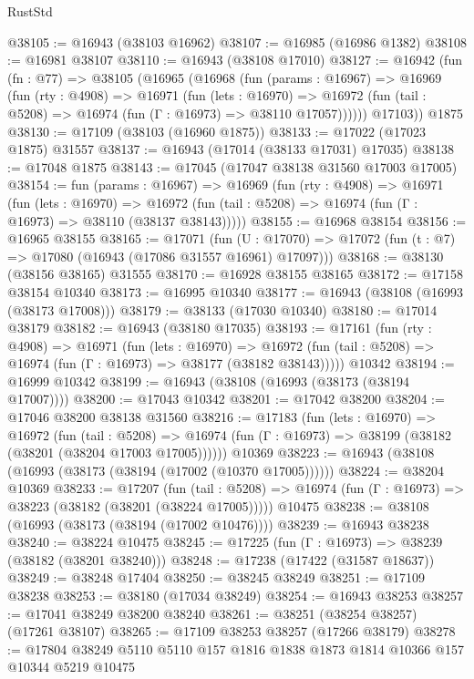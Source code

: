 \begin{lexlean}{RustStd}
\begin{coremodule}
@38105 := @16943 (@38103 @16962)
@38107 := @16985 (@16986 @1382)
@38108 := @16981 @38107
@38110 := @16943 (@38108 @17010)
@38127 := @16942
    (fun (fn : @77) =>
    @38105
      (@16965
        (@16968
          (fun (params : @16967) =>
          @16969
            (fun (rty : @4908) =>
            @16971
              (fun (lets : @16970) =>
              @16972 (fun (tail : @5208) => @16974 (fun (Γ : @16973) => @38110 @17057))))))
        @17103))
    @1875
@38130 := @17109 (@38103 (@16960 @1875))
@38133 := @17022 (@17023 @1875) @31557
@38137 := @16943 (@17014 (@38133 @17031) @17035)
@38138 := @17048 @1875
@38143 := @17045 (@17047 @38138 @31560 @17003 @17005)
@38154 := fun (params : @16967) =>
  @16969
    (fun (rty : @4908) =>
    @16971
      (fun (lets : @16970) =>
      @16972 (fun (tail : @5208) => @16974 (fun (Γ : @16973) => @38110 (@38137 @38143)))))
@38155 := @16968 @38154
@38156 := @16965 @38155
@38165 := @17071
    (fun (U : @17070) => @17072 (fun (t : @7) => @17080 (@16943 (@17086 @31557 @16961) @17097)))
@38168 := @38130 (@38156 @38165) @31555
@38170 := @16928 @38155 @38165
@38172 := @17158 @38154 @10340
@38173 := @16995 @10340
@38177 := @16943 (@38108 (@16993 (@38173 @17008)))
@38179 := @38133 (@17030 @10340)
@38180 := @17014 @38179
@38182 := @16943 (@38180 @17035)
@38193 := @17161
    (fun (rty : @4908) =>
    @16971
      (fun (lets : @16970) =>
      @16972 (fun (tail : @5208) => @16974 (fun (Γ : @16973) => @38177 (@38182 @38143)))))
    @10342
@38194 := @16999 @10342
@38199 := @16943 (@38108 (@16993 (@38173 (@38194 @17007))))
@38200 := @17043 @10342
@38201 := @17042 @38200
@38204 := @17046 @38200 @38138 @31560
@38216 := @17183
    (fun (lets : @16970) =>
    @16972
      (fun (tail : @5208) =>
      @16974 (fun (Γ : @16973) => @38199 (@38182 (@38201 (@38204 @17003 @17005))))))
    @10369
@38223 := @16943 (@38108 (@16993 (@38173 (@38194 (@17002 (@10370 @17005))))))
@38224 := @38204 @10369
@38233 := @17207
    (fun (tail : @5208) => @16974 (fun (Γ : @16973) => @38223 (@38182 (@38201 (@38224 @17005)))))
    @10475
@38238 := @38108 (@16993 (@38173 (@38194 (@17002 @10476))))
@38239 := @16943 @38238
@38240 := @38224 @10475
@38245 := @17225 (fun (Γ : @16973) => @38239 (@38182 (@38201 @38240)))
@38248 := @17238 (@17422 (@31587 @18637))
@38249 := @38248 @17404
@38250 := @38245 @38249
@38251 := @17109 @38238
@38253 := @38180 (@17034 @38249)
@38254 := @16943 @38253
@38257 := @17041 @38249 @38200 @38240
@38261 := @38251 (@38254 @38257) (@17261 @38107)
@38265 := @17109 @38253 @38257 (@17266 @38179)
@38278 := @17804 @38249 @5110 @5110 @157 @1816 @1838 @1873 @1814 @10366 @157 @10344 @5219 @10475

\end{coremodule}
\end{lexlean}
